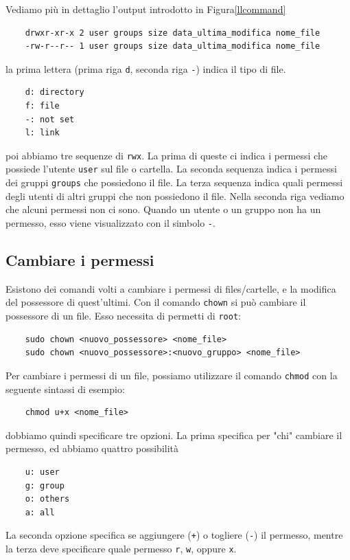 Vediamo più in dettaglio l'output introdotto in Figura\ref{llcommand}
\begin{verbatim}
	drwxr-xr-x 2 user groups size data_ultima_modifica nome_file
	-rw-r--r-- 1 user groups size data_ultima_modifica nome_file
\end{verbatim}
la prima lettera (prima riga \verb"d", seconda riga \verb"-") indica il tipo di file. 
\begin{verbatim}
	d: directory
	f: file
	-: not set
	l: link
\end{verbatim}
poi abbiamo tre sequenze di \verb"rwx". La prima di queste ci indica i permessi che possiede l'utente \verb"user" sul file o cartella. La seconda sequenza indica i permessi dei gruppi \verb"groups" che possiedono il file. La terza sequenza indica quali permessi degli utenti di altri gruppi che non possiedono il file. Nella seconda riga vediamo che alcuni permessi non ci sono. Quando un utente o un gruppo non ha un permesso, esso viene visualizzato con il simbolo \verb"-".
\subsection{Cambiare i permessi}
Esistono dei comandi volti a cambiare i permessi di files/cartelle, e la modifica del possessore di quest'ultimi. Con il comando \verb"chown" si può cambiare il possessore di un file. Esso necessita di permetti di \verb"root":
\begin{verbatim}
	sudo chown <nuovo_possessore> <nome_file>
	sudo chown <nuovo_possessore>:<nuovo_gruppo> <nome_file>
\end{verbatim}

Per cambiare i permessi di un file, possiamo utilizzare il comando \verb"chmod" con la seguente sintassi di esempio:
\begin{verbatim}
	chmod u+x <nome_file>
\end{verbatim}
dobbiamo quindi specificare tre opzioni. La prima specifica per "chi" cambiare il permesso, ed abbiamo quattro possibilità
\begin{verbatim}
	u: user
	g: group
	o: others
	a: all
\end{verbatim}
La seconda opzione specifica se aggiungere (\verb"+") o togliere (\verb"-") il permesso, mentre la terza deve specificare quale permesso \verb"r", \verb"w", oppure \verb"x".

